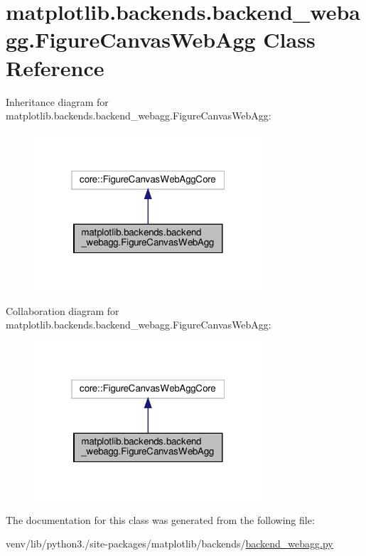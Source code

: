 \hypertarget{classmatplotlib_1_1backends_1_1backend__webagg_1_1FigureCanvasWebAgg}{}\section{matplotlib.\+backends.\+backend\+\_\+webagg.\+Figure\+Canvas\+Web\+Agg Class Reference}
\label{classmatplotlib_1_1backends_1_1backend__webagg_1_1FigureCanvasWebAgg}


Inheritance diagram for matplotlib.\+backends.\+backend\+\_\+webagg.\+Figure\+Canvas\+Web\+Agg\+:
\nopagebreak
\begin{figure}[H]
\begin{center}
\leavevmode
\includegraphics[width=241pt]{classmatplotlib_1_1backends_1_1backend__webagg_1_1FigureCanvasWebAgg__inherit__graph}
\end{center}
\end{figure}


Collaboration diagram for matplotlib.\+backends.\+backend\+\_\+webagg.\+Figure\+Canvas\+Web\+Agg\+:
\nopagebreak
\begin{figure}[H]
\begin{center}
\leavevmode
\includegraphics[width=241pt]{classmatplotlib_1_1backends_1_1backend__webagg_1_1FigureCanvasWebAgg__coll__graph}
\end{center}
\end{figure}


The documentation for this class was generated from the following file\+:\begin{DoxyCompactItemize}
\item 
venv/lib/python3./site-\/packages/matplotlib/backends/\hyperlink{backend__webagg_8py}{backend\+\_\+webagg.\+py}\end{DoxyCompactItemize}

